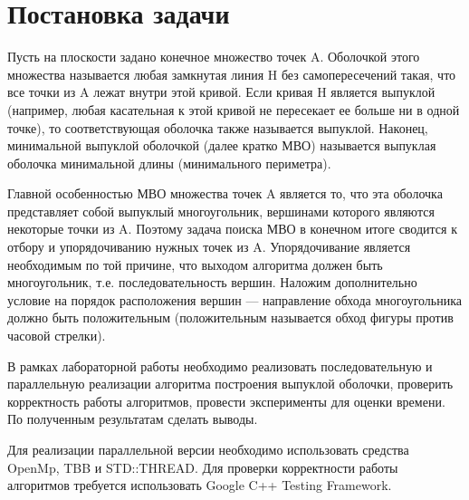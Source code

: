 \documentclass{report}
\begin{document}
\section*{Постановка задачи}
Пусть на плоскости задано конечное множество точек A. Оболочкой этого множества называется любая замкнутая линия H без самопересечений такая, что все точки из A лежат внутри этой кривой. Если кривая H является выпуклой (например, любая касательная к этой кривой не пересекает ее больше ни в одной точке), то соответствующая оболочка также называется выпуклой. Наконец, минимальной выпуклой оболочкой (далее кратко МВО) называется выпуклая оболочка минимальной длины (минимального периметра).
\par
Главной особенностью МВО множества точек A является то, что эта оболочка представляет собой выпуклый многоугольник, вершинами которого являются некоторые точки из A. Поэтому задача поиска МВО в конечном итоге сводится к отбору и упорядочиванию нужных точек из A. Упорядочивание является необходимым по той причине, что выходом алгоритма должен быть многоугольник, т.е. последовательность вершин. Наложим дополнительно условие на порядок расположения вершин — направление обхода многоугольника должно быть положительным (положительным называется обход фигуры против часовой стрелки).
\par
В рамках лабораторной работы необходимо реализовать последовательную и параллельную реализации алгоритма построения выпуклой оболочки, проверить корректность работы алгоритмов, провести эксперименты для оценки времени. По полученным результатам сделать выводы.
\par Для реализации параллельной версии необходимо использовать средства OpenMp, TBB и STD::THREAD. Для проверки корректности работы алгоритмов требуется использовать Google C++ Testing Framework.
\newpage

\end{document}
